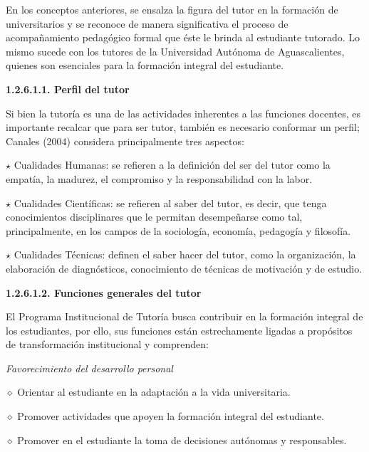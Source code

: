 En los conceptos anteriores, se ensalza la figura del tutor en la formación
de universitarios y se reconoce de manera significativa el proceso de
acompañamiento pedagógico formal que éste le brinda al estudiante tutorado.
Lo mismo sucede con los tutores de la Universidad Autónoma de
Aguascalientes, quienes son esenciales para la formación integral del
estudiante.


\medskip
{\bfseries 1.2.6.1.1. Perfil del tutor}

Si bien la tutoría es una de las actividades inherentes a las funciones
docentes, es importante recalcar que para ser tutor, también es necesario
conformar un perfil; Canales (2004) considera principalmente tres aspectos:

\begin{Obs}
\item[$\star$] Cualidades Humanas: se refieren a la definición del ser del tutor como la
empatía, la madurez, el compromiso y la responsabilidad con la labor.

\item[$\star$] Cualidades Científicas: se refieren al saber del tutor, es decir, que
tenga conocimientos disciplinares que le permitan desempeñarse como tal,
principalmente, en los campos de la sociología, economía, pedagogía y
filosofía.

\item[$\star$] Cualidades Técnicas: definen el saber hacer del tutor, como la
organización, la elaboración de diagnósticos, conocimiento de técnicas de
motivación y de estudio.
\end{Obs}

\medskip
{\bfseries 1.2.6.1.2. Funciones generales del tutor}
\enlargethispage{1\baselineskip}

El Programa Institucional de Tutoría busca contribuir en la formación
integral de los estudiantes, por ello, sus funciones están estrechamente
ligadas a propósitos de transformación institucional y comprenden:
\newpage

{\itshape Favorecimiento del desarrollo personal}

\begin{Obs}
\item[$\diamond$] Orientar al estudiante en la adaptación a la vida universitaria.
\item[$\diamond$] Promover actividades que apoyen la formación integral del estudiante.
\item[$\diamond$] Promover en el estudiante la toma de decisiones autónomas y responsables.
\end{Obs}

